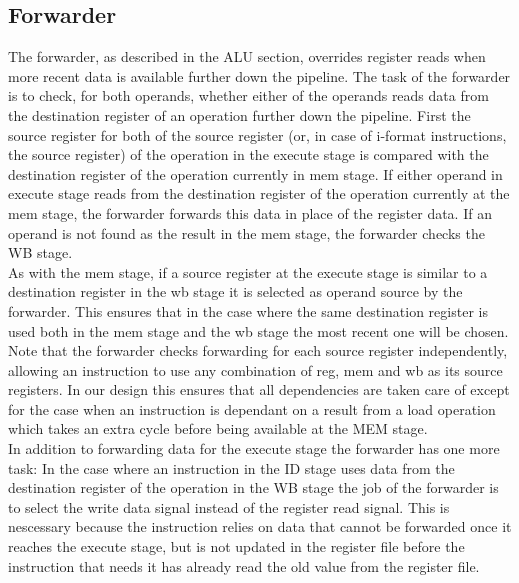 \subsection{Forwarder}
\label{section:Forwarder}
The forwarder, as described in the ALU section, overrides register reads when more recent data is available further down the pipeline.
The task of the forwarder is to check, for both operands, whether either of the operands reads data from the destination register of an operation further down the pipeline.
First the source register for both of the source register (or, in case of i-format instructions, the source register) of the operation in the execute stage is compared with the destination register of the operation currently in mem stage. 
If either operand in execute stage reads from the destination register of the operation currently at the mem stage, the forwarder forwards this data in place of the register data.
If an operand is not found as the result in the mem stage, the forwarder checks the WB stage.\\
As with the mem stage, if a source register at the execute stage is similar to a destination register in the wb stage it is selected as operand source by the forwarder. 
This ensures that in the case where the same destination register is used both in the mem stage and the wb stage the most recent one will be chosen.
Note that the forwarder checks forwarding for each source register independently, allowing an instruction to use any combination of reg, mem and wb as its source registers.
In our design this ensures that all dependencies are taken care of except for the case when an instruction is dependant on a result from a load operation which takes an extra cycle before being available at the MEM stage.\\
In addition to forwarding data for the execute stage the forwarder has one more task:
In the case where an instruction in the ID stage uses data from the destination register of the operation in the WB stage the job of the forwarder is to select the write data signal instead of the register read signal.
This is nescessary because the instruction relies on data that cannot be forwarded once it reaches the execute stage, but is not updated in the register file before the instruction that needs it has already read the old value from the register file.

